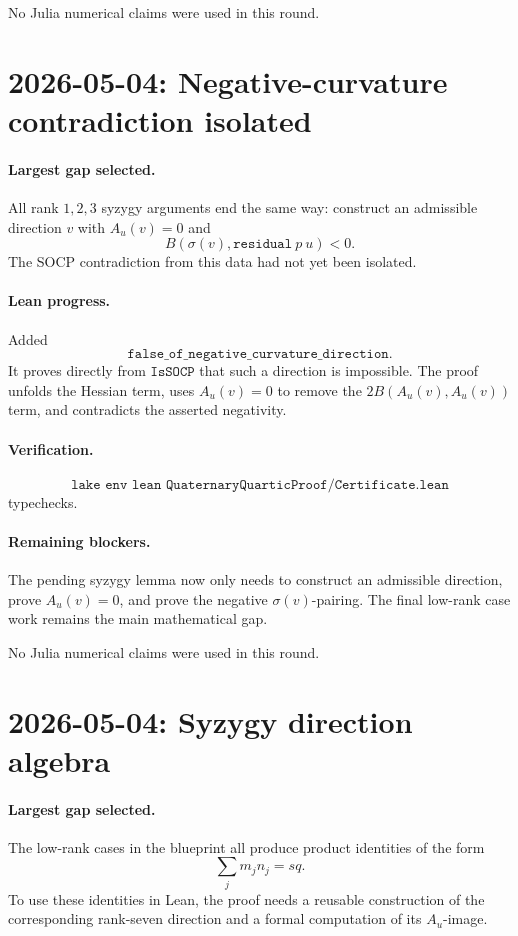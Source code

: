\documentclass[11pt]{article}
\begin{document}
No Julia numerical claims were used in this round.

\section*{2026-05-04: Negative-curvature contradiction isolated}

\paragraph{Largest gap selected.}
All rank \(1,2,3\) syzygy arguments end the same way: construct an
admissible direction \(v\) with \(A_u(v)=0\) and
\[
  B(\sigma(v),\texttt{residual}\ p\ u)<0.
\]
The SOCP contradiction from this data had not yet been isolated.

\paragraph{Lean progress.}
Added
\[
\texttt{false\_of\_negative\_curvature\_direction}.
\]
It proves directly from \(\texttt{IsSOCP}\) that such a direction is
impossible.  The proof unfolds the Hessian term, uses \(A_u(v)=0\) to remove
the \(2B(A_u(v),A_u(v))\) term, and contradicts the asserted negativity.

\paragraph{Verification.}
\[
\texttt{lake env lean QuaternaryQuarticProof/Certificate.lean}
\]
typechecks.

\paragraph{Remaining blockers.}
The pending syzygy lemma now only needs to construct an admissible direction,
prove \(A_u(v)=0\), and prove the negative \(\sigma(v)\)-pairing.  The final
low-rank case work remains the main mathematical gap.

No Julia numerical claims were used in this round.

\section*{2026-05-04: Syzygy direction algebra}

\paragraph{Largest gap selected.}
The low-rank cases in the blueprint all produce product identities of the form
\[
\sum_j m_jn_j=sq.
\]
To use these identities in Lean, the proof needs a reusable construction of
the corresponding rank-seven direction and a formal computation of its
\(A_u\)-image.
\end{document}
